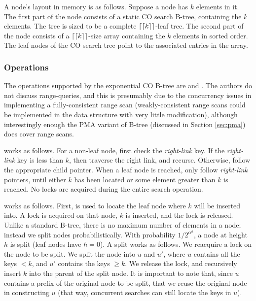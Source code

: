 \documentclass[preprint]{style}
\begin{document}
A node's layout in memory is as follows. Suppose a node has $k$ elements in
it. The first part of the node consists of a static CO search B-tree,
containing the $k$ elements. The tree is sized to be a complete $\lceil\lceil k
\rceil\rceil$-leaf tree. The second part of the node consists of a $\lceil\lceil
k \rceil\rceil$-size array containing the $k$ elements in sorted order. The leaf
nodes of the CO search tree point to the associated entries in the array.

\subsubsection{Operations}

The operations supported by the exponential CO B-tree are \Search{} and
\Insert{}. The authors do not discuss range-queries, and this is presumably
due to the concurrency issues in implementing a fully-consistent range scan
(weakly-consistent range scans could be implemented in the data structure with
very little modification), although interestingly enough the PMA variant of
B-tree (discussed in Section \ref{sec:pma}) does cover range scans.

\Search{} works as follows. For a non-leaf node, first check the
\textit{right-link} key. If the \textit{right-link} key is less than $k$, then
traverse the right link, and recurse. Otherwise, follow the appropriate child
pointer. When a leaf node is reached, only follow \textit{right-link}
pointers, until either $k$ has been located or some element greater than $k$
is reached. No locks are acquired during the entire search operation.

\Insert{} works as follows. First, \Search{} is used to locate the leaf node
where $k$ will be inserted into. A lock is acquired on that node, $k$ is
inserted, and the lock is released. Unlike a standard B-tree, there is no
maximum number of elements in a node; instead we split nodes
probabilistically. With probability ${1}/{2^{\alpha^h}}$, a node at height $h$
is split (leaf nodes have $h = 0$). A split works as follows. We reacquire a
lock on the node to be split. We split the node into $u$ and $u'$, where $u$
contains all the keys $< k$, and $u'$ contains the keys $\geq k$. We release
the lock, and recursively insert $k$ into the parent of the split node. It is
important to note that, since $u$ contains a prefix of the original node to be
split, that we reuse the original node in constructing $u$ (that way,
concurrent searches can still locate the keys in $u$).
\end{document}
